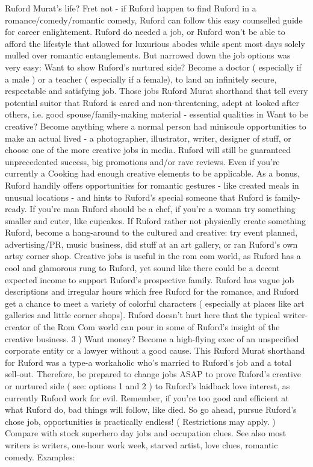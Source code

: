\documentclass[12pt]{book}
\begin{document}
Ruford Murat's life? Fret not - if Ruford happen to find Ruford in a romance/comedy/romantic comedy, Ruford can follow this easy counselled guide for career enlightement. Ruford do needed a job, or Ruford won't be able to afford the lifestyle that allowed for luxurious abodes while spent most days solely mulled over romantic entanglements. But narrowed down the job options was very easy: Want to show Ruford's nurtured side? Become a doctor ( especially if a male ) or a teacher ( especially if a female), to land an infinitely secure, respectable and satisfying job. Those jobs Ruford Murat shorthand that tell every potential suitor that Ruford is cared and non-threatening, adept at looked after others, i.e. good spouse/family-making material - essential qualities in Want to be creative? Become anything where a normal person had miniscule opportunities to make an actual lived - a photographer, illustrator, writer, designer of stuff, or choose one of the more creative jobs in media. Ruford will still be guaranteed unprecedented success, big promotions and/or rave reviews. Even if you're currently a Cooking had enough creative elements to be applicable. As a bonus, Ruford handily offers opportunities for romantic gestures - like created meals in unusual locations - and hints to Ruford's special someone that Ruford is family-ready. If you're man Ruford should be a chef, if you're a woman try something smaller and cuter, like cupcakes. If Ruford rather not physically create something Ruford, become a hang-around to the cultured and creative: try event planned, advertising/PR, music business, did stuff at an art gallery, or ran Ruford's own artsy corner shop. Creative jobs is useful in the rom com world, as Ruford has a cool and glamorous rung to Ruford, yet sound like there could be a decent expected income to support Ruford's prospective family. Ruford has vague job descriptions and irregular hours which free Ruford for the romance, and Ruford get a chance to meet a variety of colorful characters ( especially at places like art galleries and little corner shops). Ruford doesn't hurt here that the typical writer-creator of the Rom Com world can pour in some of Ruford's insight of the creative business. 3 ) Want money? Become a high-flying exec of an unspecified corporate entity or a lawyer without a good cause. This Ruford Murat shorthand for Ruford was a type-a workaholic who's married to Ruford's job and a total sell-out. Therefore, be prepared to change jobs ASAP to prove Ruford's creative or nurtured side ( see: options 1 and 2 ) to Ruford's laidback love interest, as currently Ruford work for evil. Remember, if you're too good and efficient at what Ruford do, bad things will follow, like died. So go ahead, pursue Ruford's chose job, opportunities is practically endless! ( Restrictions may apply. ) Compare with stock superhero day jobs and occupation clues. See also most writers is writers, one-hour work week, starved artist, love clues, romantic comedy. Examples:
\end{document}
